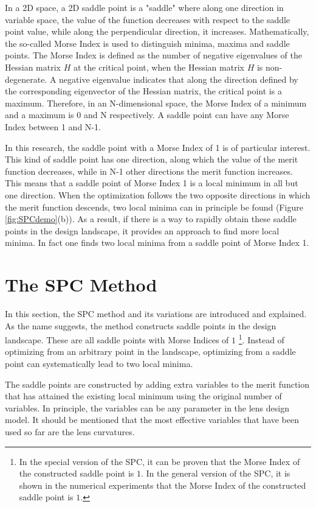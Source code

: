 In a 2D space, a 2D saddle point is a "saddle" where along one direction in variable space, the value of the function decreases with respect to the saddle point value, while along the perpendicular direction, it increases. Mathematically, the so-called Morse Index is used to distinguish minima, maxima and saddle points. The Morse Index is defined as the number of negative eigenvalues of the Hessian matrix \textbf{$H$} at the critical point, when the Hessian matrix \textbf{$H$} is non-degenerate. A negative eigenvalue indicates that along the direction defined by the corresponding eigenvector of the Hessian matrix, the critical point is a maximum. Therefore, in an N-dimensional space, the Morse Index of a minimum and a maximum is 0 and N respectively. A saddle point can have any Morse Index between 1 and N-1. 

In this research, the saddle point with a Morse Index of 1 is of particular interest. This kind of saddle point has one direction, along which the value of the merit function decreases, while in N-1 other directions the merit function increases. This means that a saddle point of Morse Index 1 is a local minimum in all but one direction. When the optimization follows the two opposite directions in which the merit function descends, two local minima can in principle be found (Figure \ref{fig:SPCdemo}(b)). As a result, if there is a way to rapidly obtain these saddle points in the design landscape, it provides an approach to find more local minima. In fact one finds two local minima from a saddle point of Morse Index 1. 

\section{The SPC Method}
In this section, the SPC method and its variations are introduced and explained. As the name suggests, the method constructs saddle points in the design landscape. These are all saddle points with Morse Indices of $1$  \footnote{In the special version of the SPC, it can be proven that the Morse Index of the constructed saddle point is $1$. In the general version of the SPC, it is shown in the numerical experiments that the Morse Index of the constructed saddle point is $1$.}. Instead of optimizing from an arbitrary point in the landscape, optimizing from a saddle point can systematically lead to two local minima. 

The saddle points are constructed by adding extra variables to the merit function that has attained the existing local minimum using the original number of variables. In principle, the variables can be any parameter in the lens design model. It should be mentioned that the most effective variables that have been used so far are the lens curvatures. 

